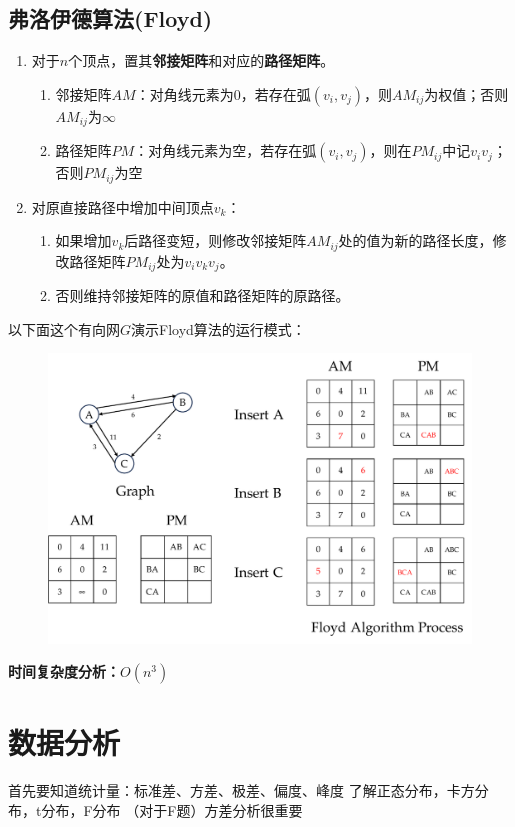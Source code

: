 \documentclass[11pt,a4paper]{article}
\begin{document}
\subsection{弗洛伊德算法(Floyd)}
\begin{enumerate}
	\item 对于$n$个顶点，置其\textbf{邻接矩阵}和对应的\textbf{路径矩阵}。
	\begin{enumerate}
		\item 邻接矩阵$AM$：对角线元素为0，若存在弧$(v_i,v_j)$，则$AM_{ij}$为权值；否则$AM_{ij}$为$\infty$
		\item 路径矩阵$PM$：对角线元素为空，若存在弧$(v_i,v_j)$，则在$PM_{ij}$中记$v_iv_j$；否则$PM_{ij}$为空
	\end{enumerate}
	\item 对原直接路径中增加中间顶点$v_k$：
	\begin{enumerate}
		\item 如果增加$v_k$后路径变短，则修改邻接矩阵$AM_{ij}$处的值为新的路径长度，修改路径矩阵$PM_{ij}$处为$v_iv_kv_j$。
		\item 否则维持邻接矩阵的原值和路径矩阵的原路径。
	\end{enumerate}
\end{enumerate}
以下面这个有向网$G$演示Floyd算法的运行模式：
\begin{center}
	\begin{figure}[h]
		\centering
		\includegraphics[scale=0.5]{Floyd.pdf}
	\end{figure}
\end{center}
{\kaishu \textbf{时间复杂度分析：}}$O(n^3)$


\section{数据分析}
首先要知道统计量：标准差、方差、极差、偏度、峰度
了解正态分布，卡方分布，t分布，F分布
（对于F题）方差分析很重要
\end{document}
